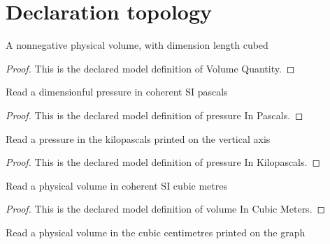 \section{Declaration topology}
\begin{definition}
  \label{def:physics:phyx-mini-0422:phyxminiproblems-problemphyxmini0422-volumequantity}
  A nonnegative physical volume, with dimension length cubed
\end{definition}
\begin{proof}
  This is the declared model definition of Volume Quantity.
\end{proof}
\begin{definition}
  \label{def:physics:phyx-mini-0422:phyxminiproblems-problemphyxmini0422-pressureinpascals}
  Read a dimensionful pressure in coherent SI pascals
\end{definition}
\begin{proof}
  This is the declared model definition of pressure In Pascals.
\end{proof}
\begin{definition}
  \label{def:physics:phyx-mini-0422:phyxminiproblems-problemphyxmini0422-pressureinkilopascals}
  Read a pressure in the kilopascals printed on the vertical axis
\end{definition}
\begin{proof}
  This is the declared model definition of pressure In Kilopascals.
\end{proof}
\begin{definition}
  \label{def:physics:phyx-mini-0422:phyxminiproblems-problemphyxmini0422-volumeincubicmeters}
  Read a physical volume in coherent SI cubic metres
\end{definition}
\begin{proof}
  This is the declared model definition of volume In Cubic Meters.
\end{proof}
\begin{definition}
  \label{def:physics:phyx-mini-0422:phyxminiproblems-problemphyxmini0422-volumeincubiccentimeters}
  Read a physical volume in the cubic centimetres printed on the graph
\end{definition}
